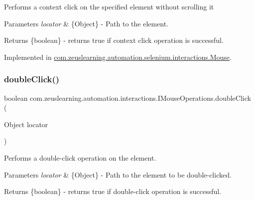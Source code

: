 Performs a context click on the specified element without scrolling it


\begin{DoxyParams}{Parameters}
{\em locator} & \{Object\} -\/ Path to the element. \\
\hline
\end{DoxyParams}
\begin{DoxyReturn}{Returns}
\{boolean\} -\/ returns {\ttfamily true} if context click operation is successful. 
\end{DoxyReturn}


Implemented in \hyperlink{classcom_1_1zeuslearning_1_1automation_1_1selenium_1_1interactions_1_1Mouse_a4da809ce4b2d0d9293b23bda7c3b98b0}{com.\+zeuslearning.\+automation.\+selenium.\+interactions.\+Mouse}.

\hypertarget{interfacecom_1_1zeuslearning_1_1automation_1_1interactions_1_1IMouseOperations_afa934246038ce6ec851e5ec765a1fb5a}{}\label{interfacecom_1_1zeuslearning_1_1automation_1_1interactions_1_1IMouseOperations_afa934246038ce6ec851e5ec765a1fb5a} 
\subsubsection{\texorpdfstring{double\+Click()}{doubleClick()}}
{\footnotesize\ttfamily boolean com.\+zeuslearning.\+automation.\+interactions.\+I\+Mouse\+Operations.\+double\+Click (\begin{DoxyParamCaption}\item[{Object}]{locator }\end{DoxyParamCaption})}

Performs a double-\/click operation on the element.


\begin{DoxyParams}{Parameters}
{\em locator} & \{Object\} -\/ Path to the element to be double-\/clicked.\\
\hline
\end{DoxyParams}
\begin{DoxyReturn}{Returns}
\{boolean\} -\/ returns {\ttfamily true} if double-\/click operation is successful. 
\end{DoxyReturn}


